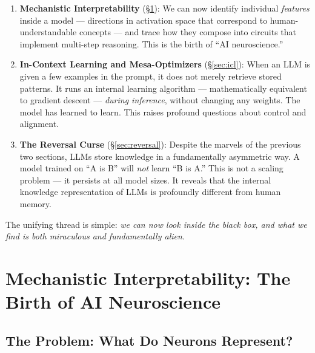 \documentclass[11pt, a4paper]{article}
\theoremstyle{definition}
\theoremstyle{plain}
\begin{document}
\begin{enumerate}[leftmargin=2em]
  \item \textbf{Mechanistic Interpretability} (\S\ref{sec:mechinterp}):
    We can now identify individual \emph{features} inside a model ---
    directions in activation space that correspond to human-understandable
    concepts --- and trace how they compose into circuits that implement
    multi-step reasoning.  This is the birth of ``AI neuroscience.''

  \item \textbf{In-Context Learning and Mesa-Optimizers}
    (\S\ref{sec:icl}): When an LLM is given a few examples in the prompt,
    it does not merely retrieve stored patterns.  It runs an internal
    learning algorithm --- mathematically equivalent to gradient descent ---
    \emph{during inference}, without changing any weights.  The model has
    learned to learn.  This raises profound questions about control and
    alignment.

  \item \textbf{The Reversal Curse} (\S\ref{sec:reversal}): Despite
    the marvels of the previous two sections, LLMs store knowledge in a
    fundamentally asymmetric way.  A model trained on ``A is B'' will
    \emph{not} learn ``B is A.''  This is not a scaling problem --- it
    persists at all model sizes.  It reveals that the internal knowledge
    representation of LLMs is profoundly different from human memory.
\end{enumerate}

The unifying thread is simple: \emph{we can now look inside the black box,
and what we find is both miraculous and fundamentally alien.}


\section{Mechanistic Interpretability: The Birth of AI Neuroscience}
\label{sec:mechinterp}

\subsection{The Problem: What Do Neurons Represent?}
\label{sec:neurons}
\end{document}
